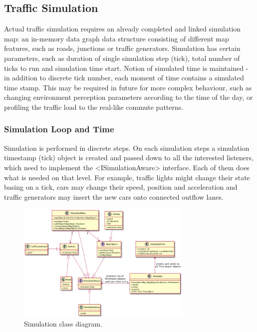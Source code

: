 \subsection{Traffic Simulation}
Actual traffic simulation requires an already completed and linked simulation map: an in-memory data graph data structure consisting of different map features, such as roads, junctions or traffic generators. Simulation has certain parameters, such as duration of single simulation step (tick), total number of ticks to run and simulation time start. Notion of simulated time is maintained - in addition to discrete tick number, each moment of time contains a simulated time stamp. This may be required in future for more complex behaviour, such as changing environment perception parameters according to the time of the day, or profiling the traffic load to the real-like commute patterns.

\subsubsection{Simulation Loop and Time}
Simulation is performed in discrete steps. On each simulation steps a simulation timestamp (tick) object is created and passed down to all the interested listeners, which need to implement the <ISimulationAware> interface. Each of them does what is needed on that level. For example, traffic lights might change their state basing on a tick, cars may change their speed, position and acceleration and traffic generators may insert the new cars onto connected outflow lanes.

\begin{figure}[h]
    \vspace{1.5em}
    \caption{Simulation class diagram.}
    \label{fig:simulationClassDiagram}
    \centering
    \includegraphics[width=0.75\textwidth]{../../uml_diagrams/simulatorClassDiagram.png}
    \vspace{1.5em}
\end{figure}

